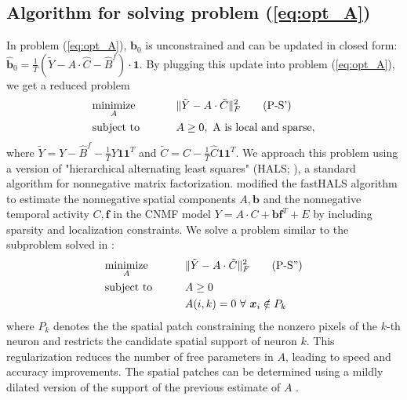 \documentclass[9pt,lineno]{elife}
\begin{document}
\subsection{Algorithm for solving problem (\ref{eq:opt_A})} 
\label{supp:update_A}
In problem (\ref{eq:opt_A}), $\bm{b}_0$ is unconstrained and can be updated in closed form: $\hat{\bm{b}}_0=\frac{1}{T}(\tilde{Y}-A\cdot\hat{C}-\hat{B}^f)\cdot \bm{1}$. By plugging this update into problem (\ref{eq:opt_A}), we get a reduced problem 
\begin{alignat}{2}
&\underset{A}{\text{minimize}}&\qquad& \|\tilde{Y}-{A}\cdot \tilde{C}\|_F^2 \label{eq:opt_A_short}\tag{P-S'}\\
&\text{subject to}~ && A\geq 0, ~ \text{A is local and sparse},\notag 
\end{alignat}
where $\tilde{Y}=Y- \hat{B}^f - \frac{1}{T}Y\bm{1}\bm{1}^T$ and $\tilde{C}=\hat{C}-\frac{1}{T}\hat{C}\bm{1}\bm{1}^T$. We approach this problem using a version of "hierarchical alternating least squares" (HALS; \citet{Cichocki2007}), a standard algorithm for nonnegative matrix factorization. \cite{Friedrich2017} modified the fastHALS algorithm \citep{Cichocki2009} to estimate the nonnegative spatial components $A, \bm{b}$ and the nonnegative temporal activity $C, \bm{f}$ in the CNMF model $Y=A\cdot C+\bm{b}\bm{f}^T+E$  by including sparsity and localization constraints. We solve a problem similar to the subproblem solved in \cite{Friedrich2017}: 
\begin{alignat}{2}
&\underset{A}{\text{minimize}} &\qquad & \|\tilde{Y}-{A}\cdot \tilde{C}\|_F^2 \label{eq:opt_A1}\tag{P-S''}\\
&\text{subject to} & &A\geq 0 \notag\\
&&&A(i, k)=0 ~ \forall ~ \bm{x}_i\notin P_k\notag
\end{alignat}
where $P_k$ denotes the the spatial patch constraining the nonzero pixels of the $k$-th neuron and restricts the candidate spatial support of neuron $k$. This regularization reduces the number of free parameters in $A$, leading to speed and accuracy improvements. The spatial patches can be determined using a mildly dilated version of the support of the previous estimate of $A$ \citep{Pnevmatikakis2016,Friedrich2016}. 

\end{document}
